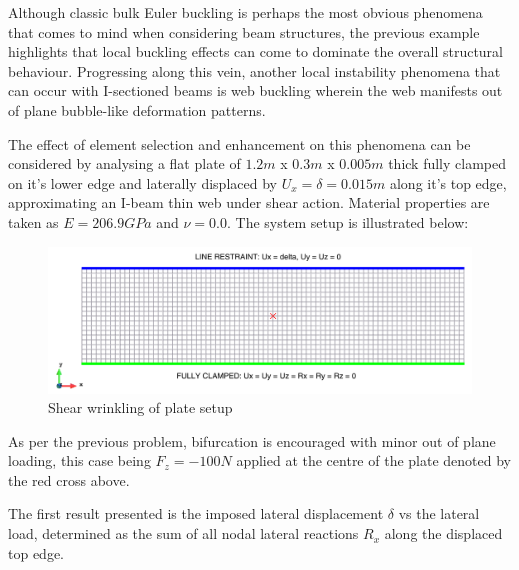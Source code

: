 Although classic bulk Euler buckling is perhaps the most obvious phenomena that comes to mind when considering beam structures, the previous example highlights that local buckling effects can come to dominate the overall structural behaviour. Progressing along this vein, another local instability phenomena that can occur with I-sectioned beams is web buckling wherein the web manifests out of plane bubble-like deformation patterns.

The effect of element selection and enhancement on this phenomena can be considered by analysing a flat plate of $1.2m$ x $0.3m$ x $0.005m$ thick fully clamped on it's lower edge and laterally displaced by $U_x = \delta = 0.015m$ along it's top edge, approximating an I-beam thin web under shear action. Material properties are taken as $E = 206.9 GPa$ and $\nu = 0.0$. The system setup is illustrated below:

\begin{figure}[H]
	\centering
	\includegraphics[width=14cm]{images/wrinkle_setup}
	\caption{Shear wrinkling of plate setup}
	\label{fig:wrinklesetup}
\end{figure}

As per the previous problem, bifurcation is encouraged with minor out of plane loading, this case being $F_z = -100N$ applied at the centre of the plate denoted by the red cross above. 

The first result presented is the imposed lateral displacement $\delta$ vs the lateral load, determined as the sum of all nodal lateral reactions $R_x$ along the displaced top edge.

